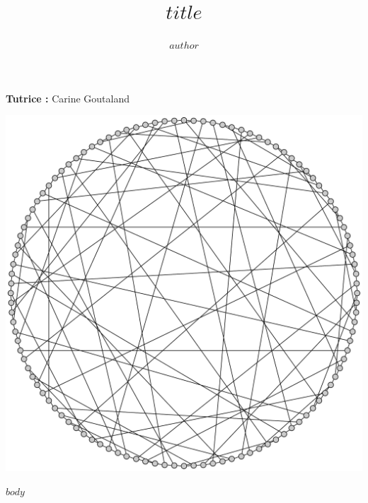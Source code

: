 \documentclass[a4paper,11pt]{article}
\title{$title$}
\author{$author$}
\date{}
\begin{document}
\maketitle
\begin{center}
\textbf{Tutrice :} Carine Goutaland
\end{center}
\vspace{2cm}
\begin{center}
\includegraphics[height=0.5\textheight]{images/cover.pdf}
\end{center}
{
  \footnotesize
  \tableofcontents
}
\newpage

\onehalfspacing

$body$
\end{document}
